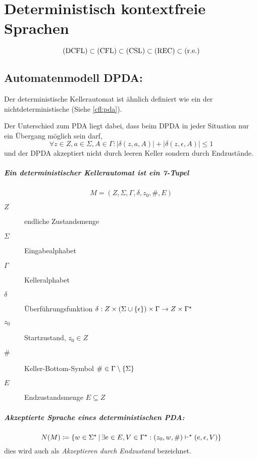 \chapter{Deterministisch kontextfreie Sprachen}
\begin{equation*}
	\mathrm{(DCFL)}\subset\mathrm{(CFL)}\subset\mathrm{(CSL)}\subset\mathrm{(REC)}\subset\mathrm{(r.e.)}
\end{equation*}

\section{Automatenmodell DPDA:}\label{dcfl:dpda}
Der deterministische Kellerautomat ist ähnlich definiert wie ein der nichtdeterministische (Siehe \autoref{cfl:pda}).

Der Unterschied zum PDA liegt dabei, dass beim DPDA in jeder Situation nur ein Übergang möglich sein darf,
\begin{equation*}
	\forall z\in Z, a\in\Sigma, A\in\Gamma : |\delta(z,a,A)|+|\delta(z,\epsilon,A)|\leq 1
\end{equation*}
und der DPDA akzeptiert nicht durch leeren Keller sondern durch Endzustände.

\paragraph{Ein deterministischer Kellerautomat ist ein 7-Tupel}
\begin{equation*}
	M=(Z,\Sigma,\Gamma,\delta,z_0,\#, E)
\end{equation*}
\begin{description}
	\item[$Z$] endliche Zustandsmenge
	\item[$\Sigma$] Eingabealphabet
	\item[$\Gamma$] Kelleralphabet
	\item[$\delta$] Überführungsfunktion $\delta:Z\times(\Sigma\cup\left\{ \epsilon \right\})\times\Gamma \rightarrow Z\times\Gamma^\star$
	\item[$z_0$] Startzustand, $z_0\in Z$
	\item[$\#$] Keller-Bottom-Symbol $\#\in \Gamma\setminus\left\{ \Sigma \right\}$
	\item[$E$] Endzustandsmenge $E\subseteq Z$
\end{description}

\paragraph{Akzeptierte Sprache eines deterministischen PDA:}
\begin{equation*}
	N(M)\coloneqq\left\{ w\in \Sigma^\star \,\middle|\, \exists e\in E, V\in \Gamma^\star: (z_0, w, \#)\vdash^\star (e,\epsilon,V) \right\}
\end{equation*}
dies wird auch als \emph{Akzeptieren durch Endzustand} bezeichnet.

